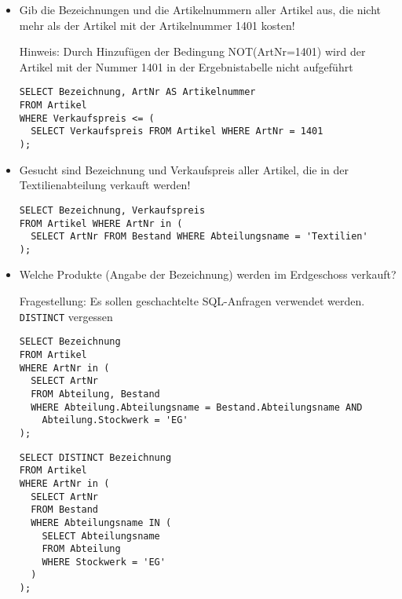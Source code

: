 \documentclass{lehramt-informatik}
\begin{document}
\begin{enumerate}
\begin{itemize}


\item Gib die Bezeichnungen und die Artikelnummern aller Artikel aus,
die nicht mehr als der Artikel mit der Artikelnummer 1401 kosten!

\begin{antwort}[muster]
Hinweis: Durch Hinzufügen der Bedingung NOT(ArtNr=1401) wird der Artikel
mit der Nummer 1401 in der Ergebnistabelle nicht aufgeführt
\begin{verbatim}
SELECT Bezeichnung, ArtNr AS Artikelnummer
FROM Artikel
WHERE Verkaufspreis <= (
  SELECT Verkaufspreis FROM Artikel WHERE ArtNr = 1401
);
\end{verbatim}
\end{antwort}


\item Gesucht sind Bezeichnung und Verkaufspreis aller Artikel, die in
der Textilienabteilung verkauft werden!

\begin{antwort}[muster]
\begin{verbatim}
SELECT Bezeichnung, Verkaufspreis
FROM Artikel WHERE ArtNr in (
  SELECT ArtNr FROM Bestand WHERE Abteilungsname = 'Textilien'
);
\end{verbatim}
\end{antwort}


\item Welche Produkte (Angabe der Bezeichnung) werden im Erdgeschoss
verkauft?

\begin{antwort}[falsch]
Fragestellung: Es sollen geschachtelte SQL-Anfragen verwendet werden.
\verb|DISTINCT| vergessen
\begin{verbatim}
SELECT Bezeichnung
FROM Artikel
WHERE ArtNr in (
  SELECT ArtNr
  FROM Abteilung, Bestand
  WHERE Abteilung.Abteilungsname = Bestand.Abteilungsname AND
    Abteilung.Stockwerk = 'EG'
);
\end{verbatim}
\end{antwort}

\begin{antwort}[muster]
\begin{verbatim}
SELECT DISTINCT Bezeichnung
FROM Artikel
WHERE ArtNr in (
  SELECT ArtNr
  FROM Bestand
  WHERE Abteilungsname IN (
    SELECT Abteilungsname
    FROM Abteilung
    WHERE Stockwerk = 'EG'
  )
);
\end{verbatim}
\end{antwort}


\end{itemize}
\end{enumerate}
\end{document}
